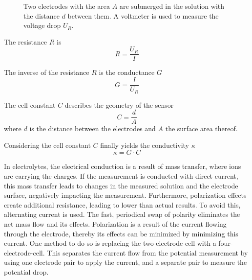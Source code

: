 \begin{figure}
	\begin{center}
    	\tikzset{external/export next=false}
		\caption[Two electrodes submerged in the solution.]{Two electrodes with the area $A$ are submerged in the solution with the distance $d$ between them. A voltmeter is used to measure the voltage drop $U_R$.}
		\label{fig:elec}
	\end{center}
\end{figure}

The resistance $ R $ is
\begin{equation}
	R = \dfrac{U_R}{I}
\label{eq:R}
\end{equation}

The inverse of the resistance $ R $ is the conductance $ G $
\begin{equation}
	G = \dfrac{I}{U_R}
\label{eq:G}
\end{equation}

The cell constant $ C $ describes the geometry of the sensor
\begin{equation}
	C = \dfrac{d}{A}
\label{eq:C}
\end{equation}
where $ d $ is the distance between the electrodes and $ A $ the surface area thereof. 

Considering the cell constant $ C $ finally yields the conductivity $\kappa$
\begin{equation}
	\kappa = G \cdot C
\label{eq:kappa} 
\end{equation}

In electrolytes, the electrical conduction is a result of mass transfer, where ions are carrying the charges. If the measurement is conducted with direct current, this mass transfer leads to changes in the measured solution and the electrode surface, negatively impacting the measurement. Furthermore, polarization effects create additional resistance, leading to lower than actual results. To avoid this, alternating current is used. The fast, periodical swap of polarity eliminates the net mass flow and its effects. Polarization is a result of the current flowing through the electrode, thereby its effects can be minimized by minimizing this current. One method to do so is replacing the two-electrode-cell with a four-electrode-cell.
This separates the current flow from the potential measurement by using one electrode pair to apply the current, and a separate pair to measure the potential drop. \\

